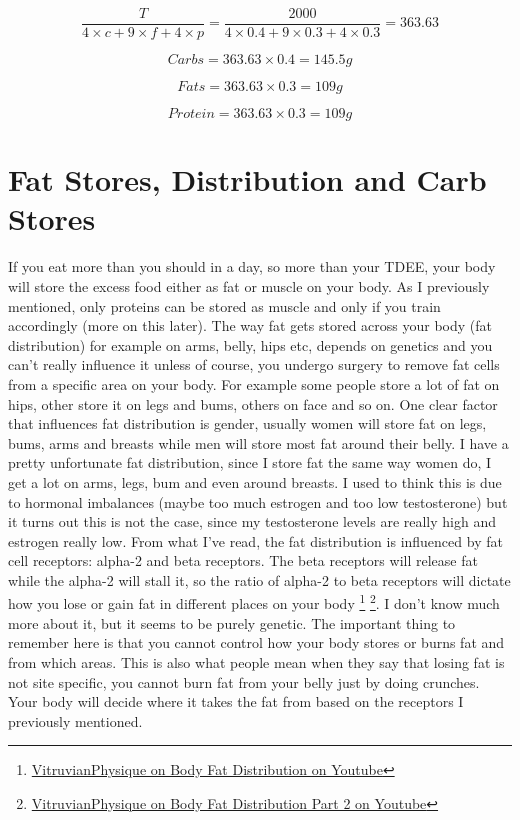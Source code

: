 \documentclass[openany, 12pt]{book}
\begin{document}
	$$ \frac{T}{4 \times c + 9 \times f + 4 \times p} = \frac{2000}{4 \times 0.4 + 9 \times 0.3 + 4 \times 0.3} = 363.63 $$
	
	$$ Carbs = 363.63 \times 0.4 = 145.5g $$
	
	$$ Fats = 363.63 \times 0.3 = 109g $$

	$$ Protein = 363.63 \times 0.3 = 109g $$		
	
	\section{Fat Stores, Distribution and Carb Stores}
	
	If you eat more than you should in a day, so more than your TDEE, your body will store the excess food either as fat or muscle on your body. As I previously mentioned, only
	proteins can be stored as muscle and only if you train accordingly (more on this later). The way fat gets stored across your body (fat distribution) for example on arms, belly,
	hips etc, depends on genetics and you can't really influence it unless of course, you undergo surgery to remove fat cells from a specific area on your body. For example some people
        store a lot of fat on hips, other store it on legs and bums, others on face and so on. One clear factor that influences fat distribution is gender, usually women will store fat on legs,
        bums, arms and breasts while men will store most fat around their belly. I have a pretty unfortunate fat distribution, since I store fat the same way women do, I get a lot on arms,
	legs, bum and even around breasts. I used to think this is due to hormonal imbalances (maybe too much estrogen and too low testosterone) but it turns out this is not the case,
	since my testosterone levels are really high and estrogen really low. From what I've read, the fat distribution is influenced by fat cell receptors: alpha-2 and beta receptors.
	The beta receptors will release fat while the alpha-2 will stall it, so the ratio of alpha-2 to beta receptors will dictate how you lose or gain fat in different places on your body
        \footnote{\href{https://www.youtube.com/watch?v=GbqN2sj8XyY}{VitruvianPhysique on Body Fat Distribution on Youtube}}
        \footnote{\href{https://www.youtube.com/watch?v=X_GeSVbAU3U}{VitruvianPhysique on Body Fat Distribution Part 2 on Youtube}}. 
	I don't know much more about it, but it seems to be purely genetic. The important thing to remember here is that you cannot control how your body stores or burns fat and from
	which areas. This is also what people mean when they say that losing fat is not site specific, you cannot burn fat from your belly just by doing crunches. Your body will decide
	where it takes the fat from based on the receptors I previously mentioned.
	
\end{document}
